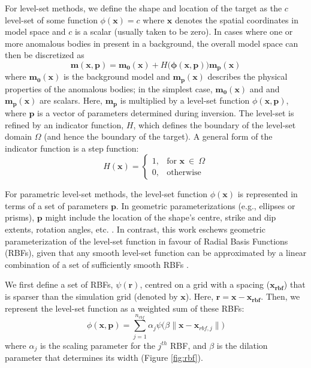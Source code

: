 \documentclass{segabs}
\begin{document}
For level-set methods, we define the shape and location of the target as the $c$ level-set of some function ${\phi(\mathbf{x})} = c$ where $\mathbf{x}$ denotes the spatial coordinates in model space and $c$ is a scalar (usually taken to be zero). In cases where one or more anomalous bodies in present in a background, the overall model space can then be discretized as  
 \begin{equation}\label{model_eq}
\mathbf{m(x, p)} = \mathbf{m_0(x)} + H\big(\mathbf{\phi(x,p)}\big)\mathbf{m_p(x)} 
\end{equation}
where $\mathbf{m_0(x)}$ is the background model and $\mathbf{m_p(x)}$ describes the physical properties of the anomalous bodies; in the simplest case, $\mathbf{m_0(x)}$ and and $\mathbf{m_p(x)}$ are scalars. Here, $\mathbf{m_p}$ is multiplied by a level-set function $\phi(\mathbf{x},\mathbf{p})$, where $\mathbf{p}$ is a vector of parameters determined during inversion. The level-set is refined by an indicator function, $H$, which defines the boundary of the level-set domain $\Omega$ (and hence the boundary of the target). A general form of the indicator function is a step function:
$$H(\mathbf{x}) = \begin{cases}
	1, & \text{for } \mathbf{x} \ \in \  \Omega\\
	0, & \text{otherwise}
\end{cases}$$

For parametric level-set methods, the level-set function $\phi(\mathbf{x})$ is represented in terms of a set of parameters $\mathbf{p}$. In geometric parameterizations (e.g., ellipses or prisms), $\mathbf{p}$ might include the location of the shape’s centre, strike and dip extents, rotation angles, etc. \citep{belliveau_parametric_2023}. In contrast, this work eschews geometric parameterization of the level-set function in favour of Radial Basis Functions (RBFs), given that any smooth level-set function can be approximated by a linear combination of a set of sufficiently smooth RBFs \citep{aghasi_parametric_2011}. 

We first define a set of RBFs, $\psi(\mathbf{r})$, centred on a grid with a spacing ($\mathbf{x_{rbf}}$) that is sparser than the simulation grid (denoted by $\mathbf{x}$). Here, $\mathbf{r} = \mathbf{x} - \mathbf{x_{rbf}}$. Then, we represent the level-set function as a weighted sum of these RBFs:
\begin{equation}\label{rbf_param} 
\phi(\mathbf{x},\mathbf{p}) = \sum_{j=1}^{n_{rbf}} \alpha_j  \psi\Big(\beta \| \mathbf{x} - \mathbf{x}_{rbf,j}\|\Big)\end{equation}
where $\alpha_j$ is the scaling parameter for the $j^{th}$ RBF, and $\beta$ is the dilation parameter that determines its width (Figure \ref{fig:rbf}).
\end{document}
